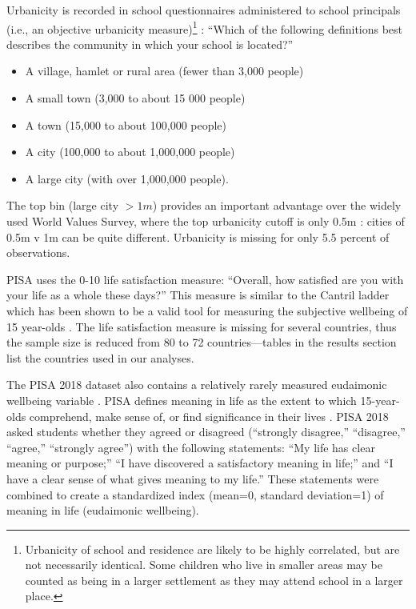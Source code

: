 \documentclass[11pt, letterpaper]{article}
\begin{document}
\begin{spacing}{1.9}
Urbanicity is recorded in school questionnaires administered to school
principals (i.e., an objective urbanicity measure)\footnote{Urbanicity of school
  and residence are likely to be highly correlated, but are not necessarily
  identical. Some children who live in smaller areas may be counted as being in
  a larger  settlement as they may attend school in a larger place.
}%
: ``Which of the following definitions best describes the community in which your school is located?''
\begin{itemize}
\item A village, hamlet or rural area (fewer than 3,000 people)
\item A small town (3,000 to about 15 000 people)
\item A town (15,000 to about 100,000 people)
\item A city (100,000 to about 1,000,000 people)
\item A large city (with over 1,000,000 people). 
\end{itemize}

The top bin (large city $>1m$) provides an important advantage over the widely
used World Values Survey, where the top urbanicity cutoff is only 0.5m
\citep{deb23,ebshoy24}: cities of 0.5m v 1m can be quite different.  Urbanicity is missing for only 5.5 percent of
observations. 

PISA uses the 0-10 life satisfaction measure: ``Overall, how satisfied are you with
your life as a whole these days?''
 This measure is similar to the Cantril ladder which has been shown to be a valid tool for
measuring the subjective wellbeing of 15 year-olds \citep{levin2014reliability}.
 The life satisfaction measure is missing for several countries, thus the sample size is reduced from 80 to 72 countries---tables in the results section list the countries used in our analyses. 

The PISA 2018 dataset also contains a relatively rarely measured eudaimonic wellbeing variable \citep[see][]{proctor16}. PISA defines meaning in life as the extent to which 15-year-olds comprehend, make sense of, or find significance in their lives \citep{pisa18}. PISA 2018 asked students whether they agreed or disagreed (``strongly disagree,'' ``disagree,'' ``agree,'' ``strongly agree'') with the following
statements: ``My life has clear meaning or purpose;'' ``I have discovered a
satisfactory meaning in life;'' and ``I have a clear sense of what gives meaning
to my life.'' These statements were combined to create a standardized index
(mean=0, standard deviation=1) of meaning in life (eudaimonic wellbeing). 



\end{spacing}
\end{document}
